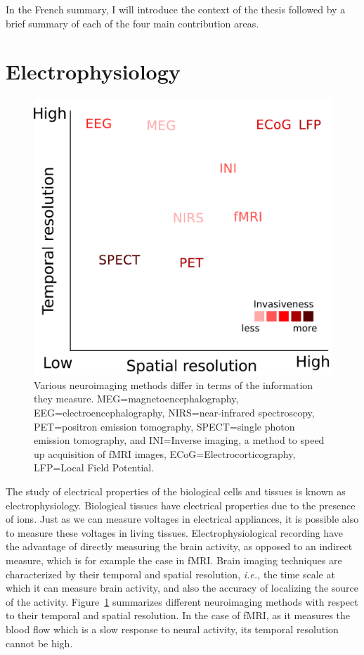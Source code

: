 In the French summary, I will introduce the context of the thesis followed by a brief summary of each of the four main contribution areas.

\section*{Electrophysiology}

\begin{figure}[htb]
\begin{center}
   \includegraphics[width=0.6\linewidth]{figures/neuroimaging_methods.pdf}
\end{center}
   \caption[]{Various neuroimaging methods differ in terms of the information they measure. MEG=magnetoencephalography, EEG=electroencephalography, NIRS=near-infrared spectroscopy, PET=positron emission tomography, SPECT=single photon emission tomography, and INI=Inverse imaging, a method to speed up acquisition of fMRI images, ECoG=Electrocorticography, LFP=Local Field Potential.}
   \label{fig:sommaire:neuroimaging_methods}
\end{figure}

The study of electrical properties of the biological cells and tissues is known as electrophysiology. 
Biological tissues have electrical properties due to the presence of ions. Just as we can measure voltages in electrical appliances, it is possible also to measure these voltages in living tissues. 
Electrophysiological recording have the advantage of directly measuring the brain activity, as opposed to an indirect measure, which is for example the case in \ac{fMRI}.
Brain imaging techniques are characterized by their temporal and spatial resolution, \textit{i.e.,} the time scale at which it can measure brain activity, and also the accuracy of localizing the source of the activity. Figure~\ref{fig:sommaire:neuroimaging_methods} summarizes different neuroimaging methods with respect to their temporal and spatial resolution. In the case of \ac{fMRI}, as it measures the blood flow which is a slow response to neural activity, its temporal resolution cannot be high. 

